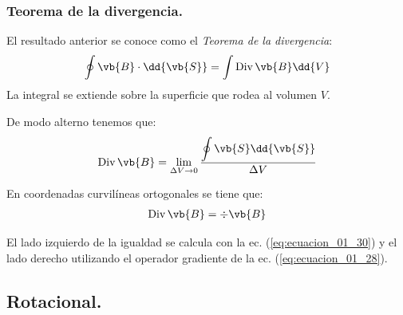 \subsubsection{Teorema de la divergencia.}

El resultado anterior se conoce como el \emph{Teorema de la divergencia}:
\begin{align}
\oint \vb{B} \cdot \dd{\vb{S}} = \int {\rm Div} \, \vb{B} \dd{V}
\label{eq:ecuacion_01_31}
\end{align}
La integral se extiende sobre la superficie que rodea al volumen $V$.
\par
De modo alterno tenemos que:
\begin{align*}
{\rm Div} \, \vb{B} = \lim_{\Delta V \to 0} \dfrac{\displaystyle \oint \vb{S} \dd{\vb{S}}}{\Delta V}
\end{align*}

En coordenadas curvilíneas ortogonales se tiene que:
\begin{align*}
{\rm Div} \, \vb{B} = \div{\vb{B}}
\end{align*}

El lado izquierdo de la igualdad se calcula con la ec. (\ref{eq:ecuacion_01_30}) y el lado derecho utilizando el operador gradiente de la ec. (\ref{eq:ecuacion_01_28}).
\par

\subsection{Rotacional.}

